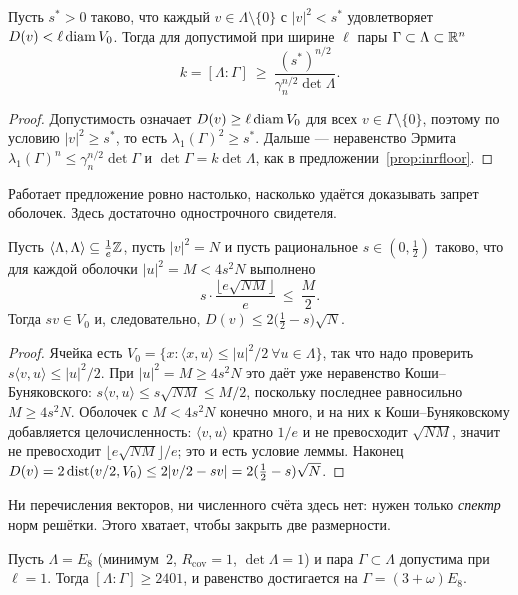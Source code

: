 \begin{proposition}\label{prop:shellfloor}
Пусть $s^{\ast}>0$ таково, что каждый $v\in\Lambda\setminus\{0\}$ с
$|v|^2<s^{\ast}$ удовлетворяет $D(v)<\ell\operatorname{diam} V_0$. Тогда для допустимой при
ширине $\ell$ пары $\Gamma\subset\Lambda\subset\mathbb{R}^n$
\[
k=[\Lambda:\Gamma]\ \ge\ \frac{(s^{\ast})^{n/2}}{\gamma_n^{n/2}\det\Lambda}.
\]
\end{proposition}

\begin{proof}
Допустимость означает $D(v)\ge\ell\operatorname{diam} V_0$ для всех $v\in\Gamma\setminus\{0\}$,
поэтому по условию $|v|^2\ge s^{\ast}$, то есть
$\lambda_1(\Gamma)^2\ge s^{\ast}$. Дальше --- неравенство Эрмита
$\lambda_1(\Gamma)^n\le\gamma_n^{n/2}\det\Gamma$ и $\det\Gamma=k\det\Lambda$,
как в предложении~\ref{prop:inrfloor}.
\end{proof}

Работает предложение ровно настолько, насколько удаётся доказывать запрет
оболочек. Здесь достаточно однострочного свидетеля.

\begin{lemma}\label{lem:radial}
Пусть $\langle\Lambda,\Lambda\rangle\subseteq\frac1e\mathbb{Z}$, пусть $|v|^2=N$
и пусть рациональное $s\in(0,\tfrac12)$ таково, что для каждой оболочки
$|u|^2=M<4s^2N$ выполнено
\[
s\cdot\frac{\bigl\lfloor e\sqrt{NM}\bigr\rfloor}{e}\ \le\ \frac M2 .
\]
Тогда $sv\in V_0$ и, следовательно,
$D(v)\le2\bigl(\tfrac12-s\bigr)\sqrt N$.
\end{lemma}

\begin{proof}
Ячейка есть $V_0=\{x:\langle x,u\rangle\le|u|^2/2\ \forall u\in\Lambda\}$, так
что надо проверить $s\langle v,u\rangle\le|u|^2/2$. При $|u|^2=M\ge4s^2N$ это
даёт уже неравенство Коши--Буняковского: $s\langle v,u\rangle\le s\sqrt{NM}\le
M/2$, поскольку последнее равносильно $M\ge4s^2N$. Оболочек с $M<4s^2N$ конечно
много, и на них к Коши--Буняковскому добавляется целочисленность: $\langle
v,u\rangle$ кратно $1/e$ и не превосходит $\sqrt{NM}$, значит не превосходит
$\lfloor e\sqrt{NM}\rfloor/e$; это и есть условие леммы. Наконец
$D(v)=2\operatorname{dist}(v/2,V_0)\le2|v/2-sv|=2(\tfrac12-s)\sqrt N$.
\end{proof}

Ни перечисления векторов, ни численного счёта здесь нет: нужен только
\emph{спектр} норм решётки. Этого хватает, чтобы закрыть две размерности.

\begin{keybox}
\begin{theorem}[$2401$ неулучшаемо на $E_8$]\label{thm:e8opt}
Пусть $\Lambda=E_8$ (минимум~$2$, $R_{\mathrm{cov}}=1$,
$\det\Lambda=1$) и пара $\Gamma\subset\Lambda$ допустима при $\ell=1$. Тогда
$[\Lambda:\Gamma]\ge2401$, и равенство достигается на
$\Gamma=(3+\omega)E_8$.
\end{theorem}
\end{keybox}

